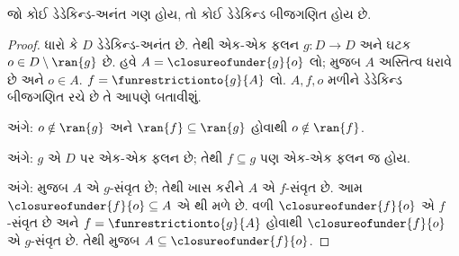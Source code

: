 \documentclass[../../../include/open-logic-section]{subfiles}
\begin{document}
\begin{thm}
જો કોઈ ડેડેકિન્ડ-અનંત ગણ હોય, તો કોઈ ડેડેકિન્ડ બીજગણિત હોય છે.
\end{thm}

\begin{proof}
ધારો કે $D$ ડેડેકિન્ડ-અનંત છે. તેથી એક-એક ફલન $g \colon D \to
D$ અને ઘટક $o \in D \setminus \ran{g}$ છે. હવે $A =
\closureofunder{g}{o}$ લો;  મુજબ $A$
અસ્તિત્વ ધરાવે છે અને $o \in A$. $f = \funrestrictionto{g}{A}$ લો.
$A, f, o$ મળીને ડેડેકિન્ડ બીજગણિત રચે છે તે આપણે બતાવીશું.

 અંગે: $o \notin \ran{g}$ અને $\ran{f}
\subseteq \ran{g}$ હોવાથી $o\notin \ran{f}$.

 અંગે: $g$ એ $D$ પર એક-એક ફલન છે; તેથી
$f \subseteq g$ પણ એક-એક ફલન જ હોય.

 અંગે:  મુજબ $A$ એ
$g$-સંવૃત છે; તેથી ખાસ કરીને $A$ એ $f$-સંવૃત છે. આમ
$\closureofunder{f}{o} \subseteq A$ એ થી મળે
છે. વળી $\closureofunder{f}{o}$ એ $f$-સંવૃત છે અને
$f = \funrestrictionto{g}{A}$ હોવાથી $\closureofunder{f}{o}$ એ
$g$-સંવૃત છે. તેથી  મુજબ
$A \subseteq \closureofunder{f}{o}$.
\end{proof}
\end{document}
